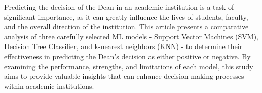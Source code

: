 Predicting the decision of the Dean in an academic institution is a task of significant importance, as it can greatly influence the lives of students, faculty, and the overall direction of the institution. This article presents a comparative analysis of three carefully selected ML models - Support Vector Machines (SVM), Decision Tree Classifier, and k-nearest neighbors (KNN) - to determine their effectiveness in predicting the Dean's decision as either positive or negative. By examining the performance, strengths, and limitations of each model, this study aims to provide valuable insights that can enhance decision-making processes within academic institutions.
